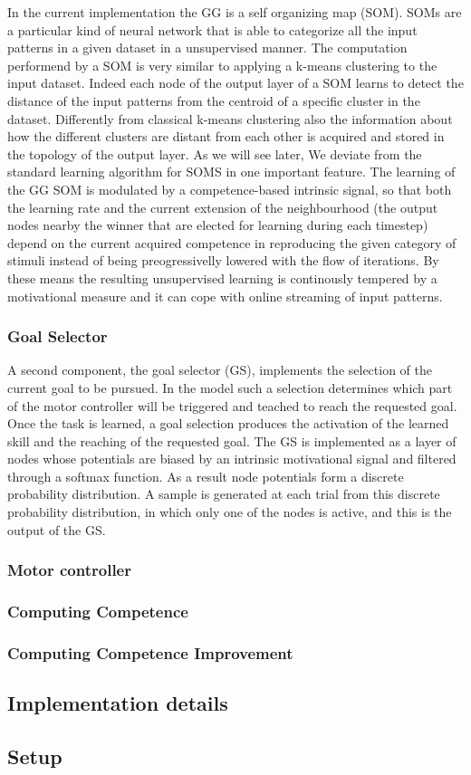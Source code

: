 In the current implementation the GG is a self organizing map (SOM). SOMs are a particular kind of neural network that is able to categorize all the input patterns in a given dataset in a unsupervised manner. The computation performend by a SOM is very similar to applying a k-means clustering to the input dataset. Indeed each node of the output layer of a SOM learns to detect the distance of the input patterns from the centroid of a specific cluster in the dataset. Differently from classical k-means clustering also the information about how the different clusters are distant from each other is  acquired and stored in the topology of the output layer.
% 
As we will see later, We deviate from the standard learning algorithm for SOMS in one important feature. The learning of the GG SOM is modulated by a competence-based intrinsic signal, so that both the learning rate and  the current extension of the neighbourhood (the output nodes nearby the winner that are elected for learning during each timestep) depend on the current acquired competence in reproducing the given category of stimuli instead of being preogressivelly lowered with the flow of iterations. By these means the resulting unsupervised learning is continously tempered by a motivational measure and it can cope with online streaming of input patterns.

\subsubsection{Goal Selector} 
\label{sec:goal_selector}
A second component, the goal selector (GS), implements the selection of the current goal to be pursued. In the model such a selection determines which part of the motor controller will be triggered and teached to reach the requested goal. Once the task is learned, a goal selection produces the activation of the learned skill and the reaching of the requested goal. The GS is implemented as a layer of nodes whose potentials are biased by an intrinsic motivational signal and filtered through a softmax function. As a result node potentials form a discrete probability distribution. A sample is generated at each trial from this discrete probability distribution, in which only one of the nodes is active, and this is the output of the GS. 

\subsubsection{Motor controller} 
\label{sec:motor_controller}

\subsubsection{Computing Competence} 
\label{sec:computing_competence}

\subsubsection{Computing Competence Improvement} 
\label{sec:computing_improvement}
 
\subsection{Implementation details}
\label{sec:Implementation}

\subsection{Setup}
\label{sec:Setup}